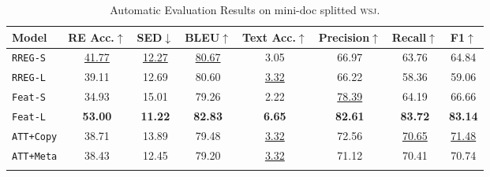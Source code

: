 \begin{table*}[t]
\centering
\begin{tabular}{lccccccc}
\lsptoprule
Model & RE Acc.$\uparrow$ & SED$\downarrow$ & BLEU$\uparrow$ & Text Acc.$\uparrow$ & Precision$\uparrow$ & Recall$\uparrow$ & F1$\uparrow$ \\ \midrule
\texttt{RREG-S} & \underline{41.77} & \underline{12.27} & \underline{80.67} & 3.05 & 66.97 & 63.76 & 64.84 \\
\texttt{RREG-L} & 39.11 & 12.69 & 80.60 & \underline{3.32} & 66.22 & 58.36 & 59.06 \\
\texttt{Feat-S} & 34.93 & 15.01 & 79.26 & 2.22 & \underline{78.39} & 64.19 & 66.66 \\
\texttt{Feat-L} & \textbf{53.00} & \textbf{11.22} & \textbf{82.83} & \textbf{6.65} & \textbf{82.61} & \textbf{83.72} & \textbf{83.14} \\
\texttt{ATT+Copy} & 38.71 & 13.89 & 79.48 & \underline{3.32} & 72.56 & \underline{70.65} & \underline{71.48} \\
\texttt{ATT+Meta} & 38.43 & 12.45 & 79.20 & \underline{3.32} & 71.12 & 70.41 & 70.74 \\
\lspbottomrule
\end{tabular}
\caption{Automatic Evaluation Results on mini-doc splitted \textsc{wsj}.}
\label{tab:wsj_minidoc}
\end{table*}
